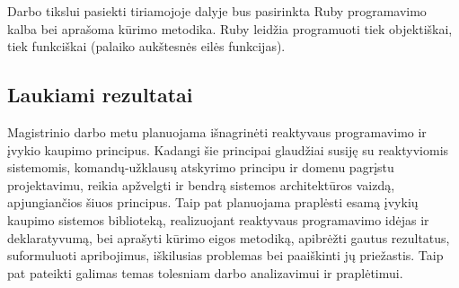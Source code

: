     Darbo tikslui pasiekti tiriamojoje dalyje bus pasirinkta Ruby programavimo kalba bei aprašoma kūrimo metodika. Ruby leidžia programuoti tiek objektiškai, tiek funkciškai (palaiko aukštesnės eilės funkcijas).

\subsection{Laukiami rezultatai}

    Magistrinio darbo metu planuojama išnagrinėti reaktyvaus programavimo ir įvykio kaupimo principus. Kadangi šie principai glaudžiai susiję su reaktyviomis sistemomis, komandų-užklausų atskyrimo principu ir domenu pagrįstu projektavimu, reikia apžvelgti ir bendrą sistemos architektūros vaizdą, apjungiančios šiuos principus. Taip pat planuojama praplėsti esamą įvykių kaupimo sistemos biblioteką, realizuojant reaktyvaus programavimo idėjas ir deklaratyvumą, bei aprašyti kūrimo eigos metodiką, apibrėžti gautus rezultatus, suformuluoti apribojimus, iškilusias problemas bei paaiškinti jų priežastis. Taip pat pateikti galimas temas tolesniam darbo analizavimui ir praplėtimui.
